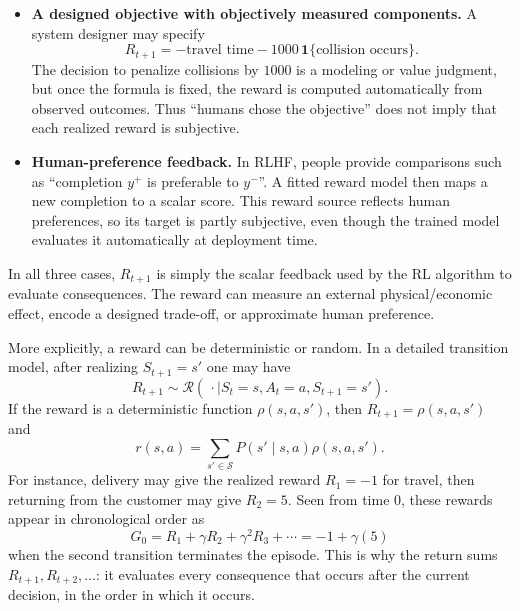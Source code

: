 \documentclass[11pt,a4paper]{article}
\theoremstyle{definition}
\begin{document}
\begin{note}
\begin{itemize}
    \item \textbf{A designed objective with objectively measured components.} A system
    designer may specify
    \[
    R_{t+1}
    =-\text{travel time}-1000\,\mathbf{1}\{\text{collision occurs}\}.
    \]
    The decision to penalize collisions by $1000$ is a modeling or value judgment, but once
    the formula is fixed, the reward is computed automatically from observed outcomes. Thus
    ``humans chose the objective'' does not imply that each realized reward is subjective.

    \item \textbf{Human-preference feedback.} In RLHF, people provide comparisons such as
    ``completion $y^+$ is preferable to $y^-$''. A fitted reward model then maps a new
    completion to a scalar score. This reward source reflects human preferences, so its
    target is partly subjective, even though the trained model evaluates it automatically at
    deployment time.
\end{itemize}
In all three cases, $R_{t+1}$ is simply the scalar feedback used by the RL algorithm to
evaluate consequences. The reward can measure an external physical/economic effect, encode a
designed trade-off, or approximate human preference.

More explicitly, a reward can be deterministic or random. In a detailed transition model,
after realizing $S_{t+1}=s'$ one may have
\[
R_{t+1}\sim\mathcal{R}(\,\cdot\mid S_t=s,A_t=a,S_{t+1}=s').
\]
If the reward is a deterministic function $\rho(s,a,s')$, then
$R_{t+1}=\rho(s,a,s')$ and
\[
r(s,a)
=\sum_{s'\in\mathcal{S}}P(s'\mid s,a)\rho(s,a,s').
\]
For instance, delivery may give the realized reward $R_1=-1$ for travel, then returning
from the customer may give $R_2=5$. Seen from time $0$, these rewards appear in chronological
order as
\[
G_0=R_1+\gamma R_2+\gamma^2R_3+\cdots=-1+\gamma(5)
\]
when the second transition terminates the episode. This is why the return sums
$R_{t+1},R_{t+2},\ldots$: it evaluates every consequence that occurs after the current
decision, in the order in which it occurs.
\end{note}
\end{document}
